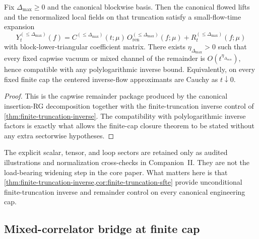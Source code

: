 \begin{corollary}\label{cor:finite-truncation-sfte}
Fix $\Delta_{\max}\ge 0$ and the canonical blockwise basis. Then the canonical flowed lifts and the renormalized local fields on that truncation satisfy a small-flow-time expansion
\[
Y_t^{(\le \Delta_{\max})}(f)=C^{(\le \Delta_{\max})}(t;\mu)\,O_{\mathrm{ren}}^{(\le \Delta_{\max})}(f;\mu)+R_t^{(\le \Delta_{\max})}(f;\mu)
\]
with block-lower-triangular coefficient matrix. There exists $\eta_{\Delta_{\max}}>0$ such that every fixed capwise vacuum or mixed channel of the remainder is $O(t^{\eta_{\Delta_{\max}}})$, hence compatible with any polylogarithmic inverse bound. Equivalently, on every fixed finite cap the centered inverse-flow approximants are Cauchy as $t\downarrow 0$.
\end{corollary}

\begin{proof}
This is the capwise remainder package produced by the canonical insertion-RG decomposition together with the finite-truncation inverse control of \cref{thm:finite-truncation-inverse}. The compatibility with polylogarithmic inverse factors is exactly what allows the finite-cap closure theorem to be stated without any extra sectorwise hypotheses.
\end{proof}

The explicit scalar, tensor, and loop sectors are retained only as audited illustrations and normalization cross-checks in Companion~II. They are not the load-bearing widening step in the core paper. What matters here is that \cref{thm:finite-truncation-inverse,cor:finite-truncation-sfte} provide unconditional finite-truncation inverse and remainder control on every canonical engineering cap.

\subsection{Mixed-correlator bridge at finite cap}

